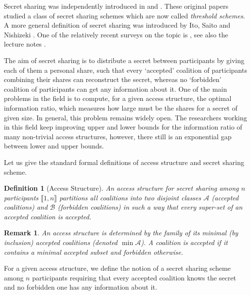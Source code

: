 \documentclass[11pt, a4paper]{kybernetika}
\newtheorem{remark}[theorem]{Remark}
\newtheorem{definition}[theorem]{Definition}
\begin{document}
	Secret sharing was independently introduced in \cite{blakley1979safeguarding} and \cite{shamir1979share}. These original papers studied a class of secret sharing schemes which are now called \emph{threshold schemes}. A more general definition of secret sharing was introduced by Ito, Saito and Nishizeki \cite{ito1989secret}.
	One of the relatively recent surveys on the topic is \cite{beimel2011secret}, see also the lecture notes \cite{padro2012lecture}. 
	
	The aim of secret sharing is to distribute a secret between participants by giving each of them a personal share, such that every `accepted' coalition of participants combining their shares can reconstruct the secret, whereas no `forbidden' coalition of participants can get any information about it. One of the main problems in the field is to compute, for a given access structure, the optimal information ratio, which measures how large must be the shares for a secret of given size. In general, this problem remains widely open.
	The researchers working in this field keep improving upper and lower bounds for the information ratio of many non-trivial access structures, however, there still is an exponential gap between lower and upper bounds. 
	
	Let us give the standard formal definitions of access structure and secret sharing scheme.
	\begin{definition}[Access Structure]
		An \emph{access structure} for secret sharing among $n$ participants $\llbracket1,n\rrbracket$ partitions all coalitions  into two disjoint classes $\mathcal{A}$ (accepted coalitions) and $\mathcal{B}$ (forbidden coalitions) in such a way that every super-set of an accepted coalition is accepted.
	\end{definition}
	\begin{remark}
		An access structure is determined by the family of its minimal (by inclusion) accepted coalitions (denoted $\min\mathcal{A}$). A coalition is accepted if it contains a minimal accepted subset and forbidden otherwise.
	\end{remark}
	
	For a given access structure, we define the notion of a secret sharing scheme among $n$ participants requiring that every accepted coalition knows the secret and no forbidden one has any information about it.
	
\end{document}
